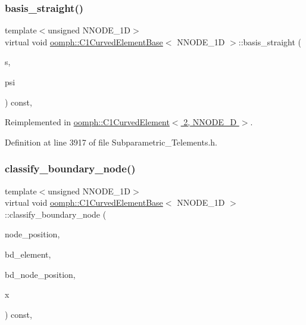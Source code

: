 \subsubsection{\texorpdfstring{basis\+\_\+straight()}{basis\_straight()}}
{\footnotesize\ttfamily template$<$unsigned N\+N\+O\+D\+E\+\_\+1D$>$ \\
virtual void \hyperlink{classoomph_1_1C1CurvedElementBase}{oomph\+::\+C1\+Curved\+Element\+Base}$<$ N\+N\+O\+D\+E\+\_\+1D $>$\+::basis\+\_\+straight (\begin{DoxyParamCaption}\item[{const \hyperlink{classoomph_1_1Vector}{Vector}$<$ double $>$ \&}]{s,  }\item[{\hyperlink{classoomph_1_1Shape}{Shape} \&}]{psi }\end{DoxyParamCaption}) const\hspace{0.3cm}{\ttfamily [inline]}, {\ttfamily [virtual]}}



Reimplemented in \hyperlink{classoomph_1_1C1CurvedElement_3_012_00_01NNODE__1D_01_4_a68d0f04ce0ead20ed00c0925e2ac89db}{oomph\+::\+C1\+Curved\+Element$<$ 2, N\+N\+O\+D\+E\+\_\+D $>$}.



Definition at line 3917 of file Subparametric\+\_\+\+Telements.\+h.

\mbox{\label{classoomph_1_1C1CurvedElementBase_ada5b9e50a71fd3e9d3975c78b5c3ed52}} 
\subsubsection{\texorpdfstring{classify\+\_\+boundary\+\_\+node()}{classify\_boundary\_node()}}
{\footnotesize\ttfamily template$<$unsigned N\+N\+O\+D\+E\+\_\+1D$>$ \\
virtual void \hyperlink{classoomph_1_1C1CurvedElementBase}{oomph\+::\+C1\+Curved\+Element\+Base}$<$ N\+N\+O\+D\+E\+\_\+1D $>$\+::classify\+\_\+boundary\+\_\+node (\begin{DoxyParamCaption}\item[{\hyperlink{classoomph_1_1DenseMatrix}{Dense\+Matrix}$<$ double $>$ \&}]{node\+\_\+position,  }\item[{unsigned \&}]{bd\+\_\+element,  }\item[{\hyperlink{classoomph_1_1DenseMatrix}{Dense\+Matrix}$<$ double $>$ \&}]{bd\+\_\+node\+\_\+position,  }\item[{\hyperlink{classoomph_1_1Vector}{Vector}$<$ double $>$ \&}]{x }\end{DoxyParamCaption}) const\hspace{0.3cm}{\ttfamily [inline]}, {\ttfamily [virtual]}}



